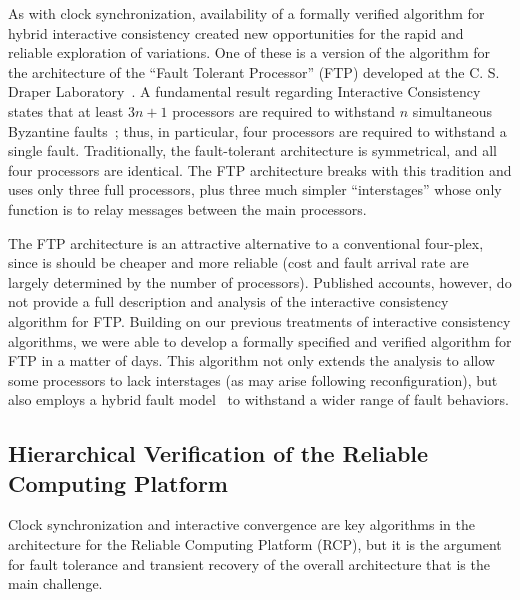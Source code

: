 
As with clock synchronization, availability of a formally verified
algorithm for hybrid interactive consistency created new
opportunities for the rapid and reliable exploration of variations.
One of these is a version of the algorithm for the architecture of
the ``Fault Tolerant Processor'' (FTP) developed at the C. S. Draper
Laboratory~\cite{Draper-FT,Lala:FTP86}.  A fundamental result
regarding Interactive Consistency states that at least $3n+1$
processors are required to withstand $n$ simultaneous Byzantine
faults~\cite{Pease}; thus, in particular, four processors are
required to withstand a single fault.  Traditionally, the
fault-tolerant architecture is symmetrical, and all four processors
are identical.  The FTP architecture breaks with this tradition and
uses only three full processors, plus three much simpler
``interstages'' whose only function is to relay messages between the
main processors.  

The FTP architecture is an attractive alternative to a conventional
four-plex, since is should be cheaper and more reliable (cost and
fault arrival rate are largely determined by the number of
processors).  Published accounts, however, do not provide a full
description and analysis of the interactive consistency algorithm for
FTP\@.  Building on our previous treatments of interactive consistency
algorithms, we were able to develop a formally specified and verified
algorithm for FTP in a matter of days.  This algorithm not only
extends the analysis to allow some processors to lack interstages (as
may arise following reconfiguration), but also employs a hybrid fault
model~\cite{Lincoln&Rushby94:FTP} to withstand a wider range of
fault behaviors.

\subsection{Hierarchical Verification of the Reliable Computing Platform}

Clock synchronization and interactive convergence are key algorithms
in the architecture for the Reliable Computing Platform (RCP), but it
is the argument for fault tolerance and transient recovery of the
overall architecture that is the main challenge.

